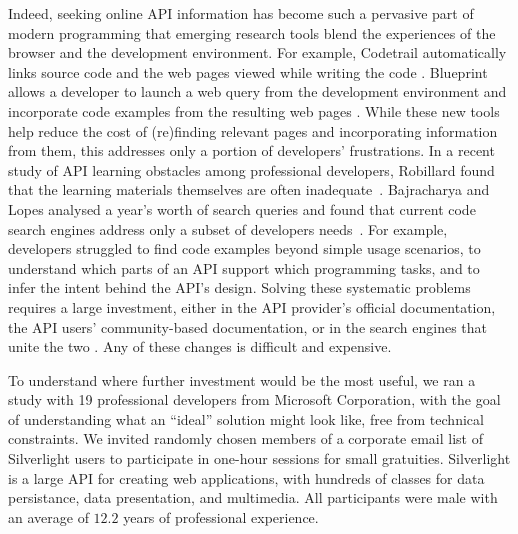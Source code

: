 Indeed, seeking online API information has become such a pervasive part of modern programming that emerging research tools blend the experiences of the browser and the development environment. For example, Codetrail automatically links source code and the web pages viewed while writing the code \cite{gm09}. Blueprint allows a developer to launch a web query from the development environment and incorporate code examples from the resulting web pages \cite{bdwk10}. While these new tools help reduce the cost of (re)finding relevant pages and incorporating information from them, this addresses only a portion of developers' frustrations. 
%
In a recent study of API learning obstacles among professional developers, Robillard found that the learning materials themselves are often inadequate~\cite{robillard09}. Bajracharya and Lopes analysed a year's worth of search queries and found that current code search engines address only a subset of developers needs~\cite{Bajracharya2009a}.   
For example, developers struggled to find code examples beyond simple usage scenarios, to understand which parts of an API support which programming tasks, and to infer the intent behind the API's design. 
Solving these systematic problems requires a large investment, either in the API provider's official documentation, the API users' community-based documentation, or in the search engines that unite the two \cite{bdwk10,Hoffmann2007a}. 
Any of these changes is difficult and expensive.


To understand where further investment would be the most useful, we ran a study with 19 professional developers from Microsoft Corporation, with the goal of understanding what an ``ideal'' solution might look like, free from technical constraints. We invited randomly chosen members of a corporate email list of  Silverlight users to participate in one-hour sessions for small gratuities. Silverlight is a large API for creating web applications, with hundreds of classes for data persistance, data presentation, and multimedia. All participants were male with an average of $12.2$ years of professional experience. 

